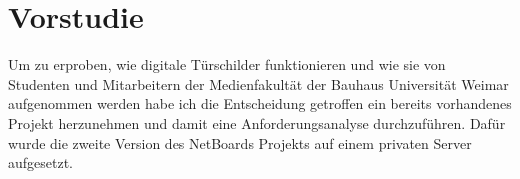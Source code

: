 \chapter{Vorstudie}\label{Vorstudie}
Um zu erproben, wie digitale Türschilder funktionieren und wie sie von Studenten und Mitarbeitern der Medienfakultät der Bauhaus Universität Weimar aufgenommen werden habe ich die Entscheidung getroffen ein bereits vorhandenes Projekt herzunehmen und damit eine Anforderungsanalyse durchzuführen.
Dafür wurde die zweite Version des NetBoards Projekts\cite{netboards:website} auf einem privaten Server aufgesetzt.
